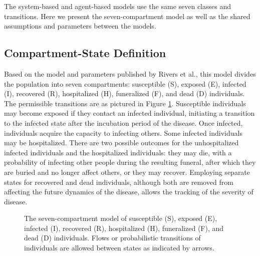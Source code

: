 The system-based and agent-based models use the same seven classes and transitions. Here we present the seven-compartment model as well as the shared assumptions and parameters between the models.%

\subsection{Compartment-State Definition}
Based on the model and parameters published by Rivers et al.\cite{Rivers2014}, this model divides the population into seven compartments: susceptible (S), exposed (E), infected (I), recovered (R), hospitalized (H), funeralized (F), and dead (D) individuals. The permissible transitions are as pictured in Figure \ref{fig:states}. Susceptible individuals may become exposed if they contact an infected individual, initiating a transition to the infected state after the incubation period of the disease. Once infected, individuals acquire the capacity to infecting others. Some infected individuals may be hospitalized. There are two possible outcomes for the unhospitalized infected individuals and the hospitalized individuals: they may die, with a probability of infecting other people during the resulting funeral, after which they are buried and no longer affect others, or they may recover. Employing separate states for recovered and dead individuals, although both are removed from affecting the future dynamics of the disease, allows the tracking of the severity of disease. 

\begin{figure}[h!]
\begin{center}
\end{center}
\caption{The seven-compartment model of susceptible (S), exposed (E), infected (I), recovered (R), hospitalized (H), funeralized (F), and dead (D) individuals. Flows or probabilistic transitions of individuals are allowed between states as indicated by arrows.}
\label{fig:states}
\end{figure}

